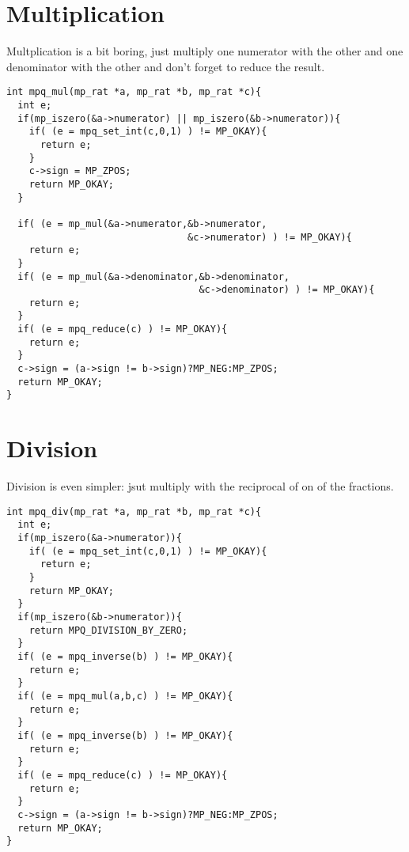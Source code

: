 \documentclass[10pt]{book}
\theoremstyle{definition}
\theoremstyle{remark}
\begin{document}
\section{Multiplication}
Multplication is a bit boring, just multiply one numerator with the other and
one denominator with the other and don't forget to reduce the result.
 \begin{center}
    \begin{lstlisting}[caption={Multiplication},label=mulrat]
int mpq_mul(mp_rat *a, mp_rat *b, mp_rat *c){
  int e;
  if(mp_iszero(&a->numerator) || mp_iszero(&b->numerator)){
    if( (e = mpq_set_int(c,0,1) ) != MP_OKAY){
      return e;
    }
    c->sign = MP_ZPOS;
    return MP_OKAY;
  }

  if( (e = mp_mul(&a->numerator,&b->numerator,
                                &c->numerator) ) != MP_OKAY){
    return e;
  }
  if( (e = mp_mul(&a->denominator,&b->denominator,
                                  &c->denominator) ) != MP_OKAY){
    return e;
  }
  if( (e = mpq_reduce(c) ) != MP_OKAY){
    return e;
  }
  c->sign = (a->sign != b->sign)?MP_NEG:MP_ZPOS;
  return MP_OKAY;
}
    \end{lstlisting}
  \end{center}
\section{Division}
Division is even simpler: jsut multiply with the reciprocal of on of the
fractions.
 \begin{center}
    \begin{lstlisting}[caption={Division},label=divrat]
int mpq_div(mp_rat *a, mp_rat *b, mp_rat *c){
  int e;
  if(mp_iszero(&a->numerator)){
    if( (e = mpq_set_int(c,0,1) ) != MP_OKAY){
      return e;
    }
    return MP_OKAY;
  }
  if(mp_iszero(&b->numerator)){
    return MPQ_DIVISION_BY_ZERO;
  }
  if( (e = mpq_inverse(b) ) != MP_OKAY){
    return e;
  }
  if( (e = mpq_mul(a,b,c) ) != MP_OKAY){
    return e;
  }
  if( (e = mpq_inverse(b) ) != MP_OKAY){
    return e;
  }
  if( (e = mpq_reduce(c) ) != MP_OKAY){
    return e;
  }
  c->sign = (a->sign != b->sign)?MP_NEG:MP_ZPOS;
  return MP_OKAY;
}
    \end{lstlisting}
  \end{center}
\end{document}

